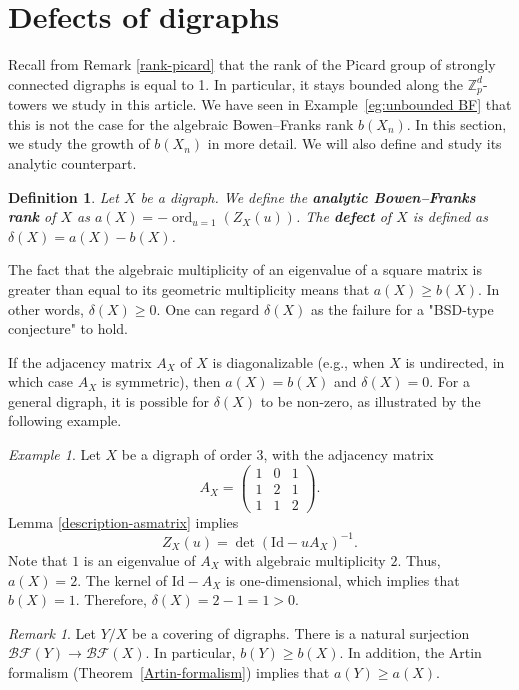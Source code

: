\documentclass[11pt]{amsart}
\DeclareMathOperator{\ord}{ord}
\newtheorem{defn}[theorem]{Definition}
\numberwithin{equation}{section}
\theoremstyle{remark}
\newtheorem{remark}[theorem]{Remark}
\newtheorem{example}[theorem]{Example}
\newcommand{\?}{\stackrel{?}{=}}
\newcommand{\Z}{\mathbb{Z}}
\newcommand{\BF}{\mathcal{BF}}
\begin{document}
\section{Defects of digraphs}
Recall from Remark \ref{rank-picard} that the rank of the Picard group of strongly connected digraphs is equal to 1. In particular, it stays bounded along the $\Z_p^d$-towers we study in this article. We have seen in Example~\ref{eg:unbounded BF} that this is not the case for the algebraic Bowen--Franks rank $b(X_n)$.  In this section, we study the growth of $b(X_n)$ in more detail. We will also define and study its analytic counterpart.


\begin{defn}
    Let $X$ be a digraph. We define the \textbf{analytic Bowen--Franks rank} of $X$ as  $a(X)=-\ord_{u=1}(Z_X(u))$. The \textbf{defect} of $X$ is defined as $\delta(X)=a(X)-b(X)$. 
\end{defn}
The fact that the algebraic multiplicity of an eigenvalue of a square matrix is greater than equal to its geometric multiplicity means that $a(X)\ge b(X)$. In other words, $\delta(X)\ge0$.
One can regard $\delta(X)$ as the failure for a "BSD-type conjecture" to hold.    

If the adjacency matrix $A_X$ of $X$ is diagonalizable (e.g., when $X$ is undirected, in which case $A_X$ is symmetric), then $a(X)=b(X)$ and $\delta(X)=0$. For a general digraph, it is possible for $\delta(X)$ to be non-zero, as illustrated by the following example.

\begin{example}
\label{example:pos-defect}
    Let $X$ be a digraph of order 3, with the adjacency matrix
    \[A_X=\begin{pmatrix}
        1&0&1\\
        1&2&1\\
        1&1&2
    \end{pmatrix}.\]
    Lemma \ref{description-asmatrix} implies
    \[Z_X(u)=\det(\mathrm{Id}-uA_X)^{-1}.\]
    Note that $1$ is an eigenvalue of $A_X$ with algebraic multiplicity $2$. Thus, $a(X)=2$. The kernel of $\mathrm{Id}-A_X$ is  one-dimensional, which implies that $b(X)=1$. Therefore, $\delta(X)=2-1=1>0$.
\end{example}

\begin{remark}
    Let $Y/X$ be a covering of digraphs. There is a natural surjection $\BF(Y)\to \BF(X)$. In particular, $b(Y)\ge b(X)$. In addition, the Artin formalism (Theorem~\ref{Artin-formalism}) implies that $a(Y)\ge a(X)$. 
\end{remark}
\end{document}
